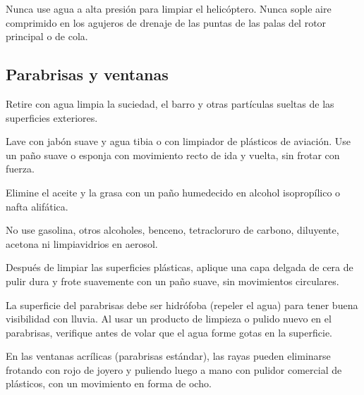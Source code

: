 \begin{precaucion}
Nunca use agua a alta presión para limpiar el helicóptero. Nunca sople aire comprimido en los agujeros de drenaje de las puntas de las palas del rotor principal o de cola.
\end{precaucion}

\subsection{Parabrisas y ventanas}

\begin{pasos}
\item Retire con agua limpia la suciedad, el barro y otras partículas sueltas de las superficies exteriores.
\item Lave con jabón suave y agua tibia o con limpiador de plásticos de aviación. Use un paño suave o esponja con movimiento recto de ida y vuelta, sin frotar con fuerza.
\item Elimine el aceite y la grasa con un paño humedecido en alcohol isopropílico o nafta alifática.
\end{pasos}

\begin{precaucion}
No use gasolina, otros alcoholes, benceno, tetracloruro de carbono, diluyente, acetona ni limpiavidrios en aerosol.
\end{precaucion}

\begin{pasos}
\setcounter{enumi}{3}
\item Después de limpiar las superficies plásticas, aplique una capa delgada de cera de pulir dura y frote suavemente con un paño suave, sin movimientos circulares.
\end{pasos}

\begin{precaucion}
La superficie del parabrisas debe ser hidrófoba (repeler el agua) para tener buena visibilidad con lluvia. Al usar un producto de limpieza o pulido nuevo en el parabrisas, verifique antes de volar que el agua forme gotas en la superficie.
\end{precaucion}

\begin{pasos}
\setcounter{enumi}{4}
\item En las ventanas acrílicas (parabrisas estándar), las rayas pueden eliminarse frotando con rojo de joyero y puliendo luego a mano con pulidor comercial de plásticos, con un movimiento en forma de ocho.
\end{pasos}

